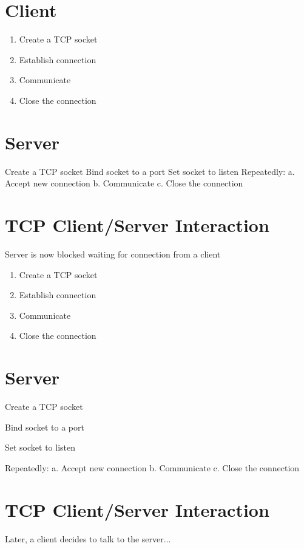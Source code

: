 \documentclass[10pt]{article}
\begin{document}
\section{Client}
\begin{enumerate}
  \item Create a TCP socket

  \item Establish connection

  \item Communicate

  \item Close the connection

\end{enumerate}

\section{Server}
Create a TCP socket Bind socket to a port Set socket to listen Repeatedly:
a. Accept new connection
b. Communicate
c. Close the connection

\section{TCP Client/Server Interaction}
Server is now blocked waiting for connection from a client



\begin{enumerate}
  \item Create a TCP socket

  \item Establish connection

  \item Communicate

  \item Close the connection

\end{enumerate}

\section{Server}
Create a TCP socket

Bind socket to a port

Set socket to listen

Repeatedly:
a. Accept new connection
b. Communicate
c. Close the connection

\section{TCP Client/Server Interaction}
Later, a client decides to talk to the server...
\end{document}
